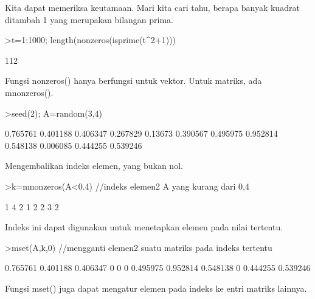 \documentclass[a4paper,10pt]{article}
\begin{document}
\begin{eulernotebook}
\begin{eulercomment}
\begin{eulercomment}
\begin{eulercomment}
\begin{eulercomment}
\begin{eulercomment}
\begin{eulercomment}
\begin{eulercomment}
Kita dapat memeriksa keutamaan. Mari kita cari tahu, berapa banyak
kuadrat ditambah 1 yang merupakan bilangan prima.
\end{eulercomment}
\begin{eulerprompt}
>t=1:1000; length(nonzeros(isprime(t^2+1)))
\end{eulerprompt}
\begin{euleroutput}
  112
\end{euleroutput}
\begin{eulercomment}
Fungsi nonzeros() hanya berfungsi untuk vektor. Untuk matriks, ada
mnonzeros().
\end{eulercomment}
\begin{eulerprompt}
>seed(2); A=random(3,4)
\end{eulerprompt}
\begin{euleroutput}
       0.765761      0.401188      0.406347      0.267829 
        0.13673      0.390567      0.495975      0.952814 
       0.548138      0.006085      0.444255      0.539246 
\end{euleroutput}
\begin{eulercomment}
Mengembalikan indeks elemen, yang bukan nol.
\end{eulercomment}
\begin{eulerprompt}
>k=mnonzeros(A<0.4) //indeks elemen2 A yang kurang dari 0,4
\end{eulerprompt}
\begin{euleroutput}
              1             4 
              2             1 
              2             2 
              3             2 
\end{euleroutput}
\begin{eulercomment}
Indeks ini dapat digunakan untuk menetapkan elemen pada nilai
tertentu.
\end{eulercomment}
\begin{eulerprompt}
>mset(A,k,0) //mengganti elemen2 suatu matriks pada indeks tertentu
\end{eulerprompt}
\begin{euleroutput}
       0.765761      0.401188      0.406347             0 
              0             0      0.495975      0.952814 
       0.548138             0      0.444255      0.539246 
\end{euleroutput}
\begin{eulercomment}
Fungsi mset() juga dapat mengatur elemen pada indeks ke entri matriks
lainnya.
\end{eulercomment}
\begin{eulerprompt}

\end{eulerprompt}
\end{eulercomment}
\end{eulercomment}
\end{eulercomment}
\end{eulercomment}
\end{eulercomment}
\end{eulercomment}
\end{eulernotebook}
\end{document}
